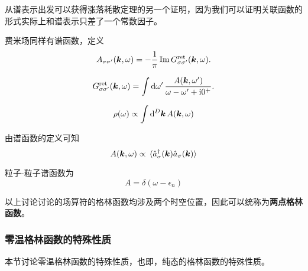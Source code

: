 \documentclass[hyperref, UTF8, a4paper]{ctexart}
\newcommand*{\ii}{\mathrm{i}}
\begin{document}
从谱表示出发可以获得涨落耗散定理的另一个证明，因为我们可以证明关联函数的形式实际上和谱表示只差了一个常数因子。

费米场同样有谱函数，定义
\begin{equation}
    A_{\sigma \sigma'}(\vb*{k}, \omega) = - \frac{1}{\pi} \Im G^\text{ret}_{\sigma \sigma'}(\vb*{k}, \omega).
\end{equation}

\begin{equation}
    G^\text{ret}_{\sigma \sigma'}(\vb*{k}, \omega) = \int \dd{\omega'} \frac{A(\vb*{k}, \omega')}{\omega - \omega' + \ii 0^+}.
\end{equation}

\[
    \rho(\omega) \propto \int \dd[D]{\vb*{k}} A(\vb*{k}, \omega)
\]

由谱函数的定义可知
\[
    A(\vb*{k}, \omega) \propto \expval*{\hat{a}_\sigma^\dagger(\vb*{k}) \hat{a}_\sigma(\vb*{k})}
\]

粒子-粒子谱函数为
\begin{equation}
    A = \delta(\omega - \epsilon_n)
\end{equation}

以上讨论讨论的场算符的格林函数均涉及两个时空位置，因此可以统称为\textbf{两点格林函数}。

\subsubsection{零温格林函数的特殊性质}

本节讨论零温格林函数的特殊性质，也即，纯态的格林函数的特殊性质。
\end{document}
